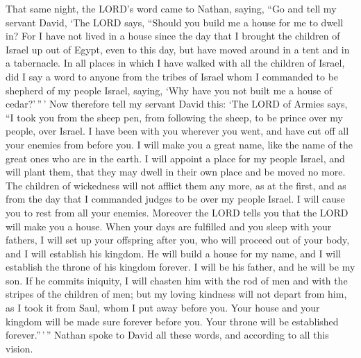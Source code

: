  That same night, the LORD's word came to Nathan, saying,
 ``Go and tell my servant David, `The LORD says, ``Should
you build me a house for me to dwell in?  For I have not
lived in a house since the day that I brought the children of Israel up
out of Egypt, even to this day, but have moved around in a tent and in a
tabernacle.  In all places in which I have walked with all
the children of Israel, did I say a word to anyone from the tribes of
Israel whom I commanded to be shepherd of my people Israel, saying, `Why
have you not built me a house of cedar?'\,''\,'  Now
therefore tell my servant David this: `The LORD of Armies says, ``I took
you from the sheep pen, from following the sheep, to be prince over my
people, over Israel.  I have been with you wherever you
went, and have cut off all your enemies from before you. I will make you
a great name, like the name of the great ones who are in the earth.
 I will appoint a place for my people Israel, and will
plant them, that they may dwell in their own place and be moved no more.
The children of wickedness will not afflict them any more, as at the
first,  and as from the day that I commanded judges to be
over my people Israel. I will cause you to rest from all your enemies.
Moreover the LORD tells you that the LORD will make you a house.
 When your days are fulfilled and you sleep with your
fathers, I will set up your offspring after you, who will proceed out of
your body, and I will establish his kingdom.  He will build
a house for my name, and I will establish the throne of his kingdom
forever.  I will be his father, and he will be my son. If
he commits iniquity, I will chasten him with the rod of men and with the
stripes of the children of men;  but my loving kindness
will not depart from him, as I took it from Saul, whom I put away before
you.  Your house and your kingdom will be made sure forever
before you. Your throne will be established forever.''\,'\,''
 Nathan spoke to David all these words, and according to
all this vision.

